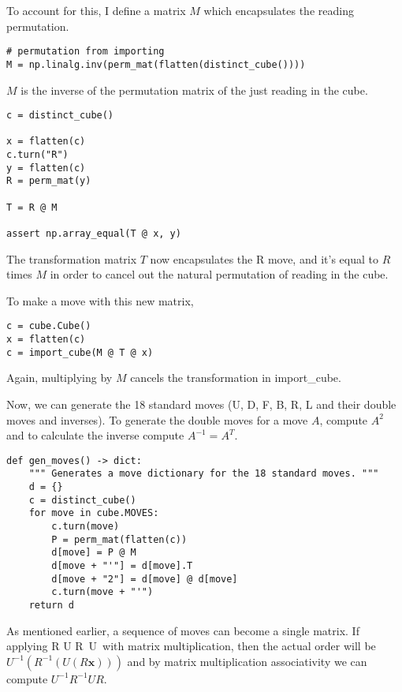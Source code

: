 \documentclass[11pt, oneside]{article}
\newcommand{\dash}{\textquotesingle}
\newcommand{\ve}[1]{\mathbf{#1}}
\begin{document}
To account for this, I define a matrix \( M \)
which encapsulates the reading permutation.

\begin{verbatim}
# permutation from importing
M = np.linalg.inv(perm_mat(flatten(distinct_cube())))
\end{verbatim}

\( M \) is the inverse of the permutation matrix of the just reading in the cube.

\begin{verbatim}
c = distinct_cube()

x = flatten(c)
c.turn("R")
y = flatten(c)
R = perm_mat(y)

T = R @ M

assert np.array_equal(T @ x, y)
\end{verbatim}

The transformation matrix \( T \) now encapsulates the R move,
and it's equal to \( R \) times \( M \) in order to cancel out the natural permutation of reading in the cube.

To make a move with this new matrix,

\begin{verbatim}
c = cube.Cube()
x = flatten(c)
c = import_cube(M @ T @ x)
\end{verbatim}

Again, multiplying by \( M \) cancels the transformation in import\_cube.

Now, we can generate the 18 standard moves (U, D, F, B, R, L and their double moves
and inverses). To generate the double moves for a move \( A \), compute \( A^2 \) and to calculate the inverse compute \( A^{-1} = A^T \).

\begin{verbatim}
def gen_moves() -> dict:
    """ Generates a move dictionary for the 18 standard moves. """
    d = {}
    c = distinct_cube()
    for move in cube.MOVES:
        c.turn(move)
        P = perm_mat(flatten(c))
        d[move] = P @ M
        d[move + "'"] = d[move].T
        d[move + "2"] = d[move] @ d[move]
        c.turn(move + "'")
    return d
\end{verbatim}

As mentioned earlier, a sequence of moves can become a single matrix.
If applying R U R\dash \ U\dash \ with matrix multiplication, then
the actual order will be \( U^{-1}(R^{-1}(U(R\ve{x}))) \)
and by matrix multiplication associativity we can compute \( U^{-1} R^{-1} U R \).
\end{document}
